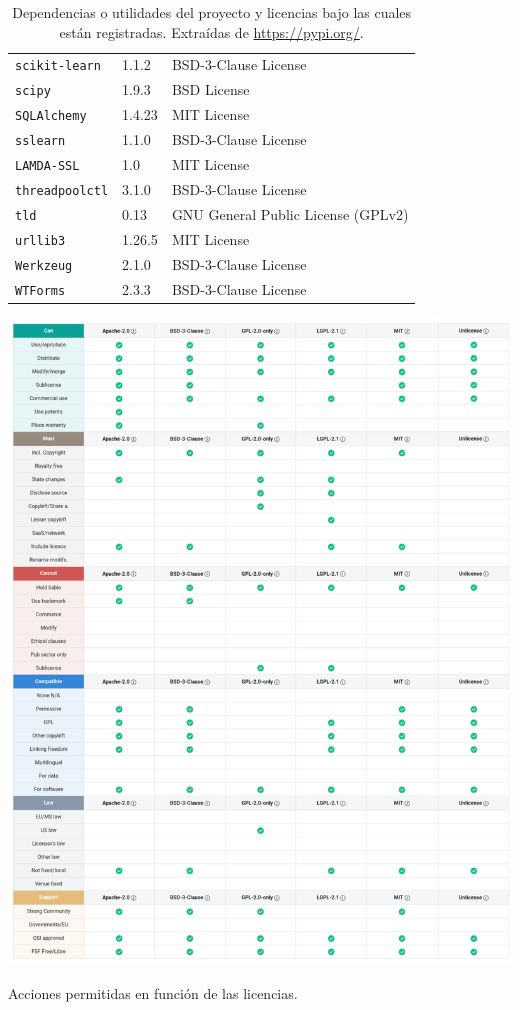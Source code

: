 \begin{table}[p]
\begin{tabularx}{\linewidth}{ p{} p{} p{} }
		\texttt{scikit-learn} & 1.1.2 & BSD-3-Clause License\\
		\texttt{scipy} & 1.9.3 & BSD License \\
		\texttt{SQLAlchemy} & 1.4.23 & MIT License \\
		\texttt{sslearn} & 1.1.0 & BSD-3-Clause License \\
		\texttt{LAMDA-SSL} & 1.0 & MIT License \\
		\texttt{threadpoolctl} & 3.1.0 & BSD-3-Clause License \\
		\texttt{tld} & 0.13 & GNU General Public License (GPLv2)\\
		\texttt{urllib3} & 1.26.5 & MIT License \\
		\texttt{Werkzeug} & 2.1.0 & BSD-3-Clause License \\
		\texttt{WTForms} & 2.3.3 & BSD-3-Clause License \\
		\bottomrule
	\end{tabularx}
	\caption[Licencias: dependencias o utilidades]{Dependencias o utilidades del proyecto y licencias bajo las cuales están registradas. Extraídas de \url{https://pypi.org/}.}
	\label{a:licencias}
\end{table}

\begin{table}[p]
	\centering
	\includegraphics[width=\textwidth]{../img/anexos/licenses/licenses}
	\caption[Licencias: permisos]{Acciones permitidas en función de las licencias.}
	\label{a:permisos}
\end{table}

